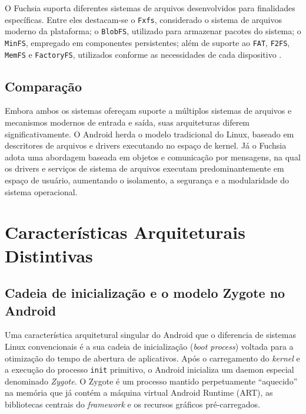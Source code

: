 \documentclass[12pt,a4paper]{article}
\begin{document}
O Fuchsia suporta diferentes sistemas de arquivos desenvolvidos para finalidades
específicas. Entre eles destacam-se o \texttt{Fxfs}, considerado o sistema de
arquivos moderno da plataforma; o \texttt{BlobFS}, utilizado para armazenar
pacotes do sistema; o \texttt{MinFS}, empregado em componentes persistentes;
além de suporte ao \texttt{FAT}, \texttt{F2FS}, \texttt{MemFS} e
\texttt{FactoryFS}, utilizados conforme as necessidades de cada dispositivo
\cite{fuchsia_fs}.

\subsection{Comparação}

Embora ambos os sistemas ofereçam suporte a múltiplos sistemas de arquivos e
mecanismos modernos de entrada e saída, suas arquiteturas diferem
significativamente. O Android herda o modelo tradicional do Linux, baseado em
descritores de arquivos e drivers executando no espaço de kernel. Já o Fuchsia
adota uma abordagem baseada em objetos e comunicação por mensagens, na qual os
drivers e serviços de sistema de arquivos executam predominantemente em espaço
de usuário, aumentando o isolamento, a segurança e a modularidade do sistema
operacional.

\section{Características Arquiteturais Distintivas}
\label{sec:caracteristicas_distintivas}

\subsection{Cadeia de inicialização e o modelo Zygote no Android}

Uma característica arquitetural singular do Android que o diferencia de sistemas
Linux convencionais é a sua cadeia de inicialização (\emph{boot process})
voltada para a otimização do tempo de abertura de aplicativos. Após o
carregamento do \emph{kernel} e a execução do processo \texttt{init} primitivo,
o Android inicializa um daemon especial denominado \emph{Zygote}. O Zygote é um
processo mantido perpetuamente ``aquecido'' na memória que já contém a máquina
virtual Android Runtime (ART), as bibliotecas centrais do \emph{framework} e os
recursos gráficos pré-carregados.
\end{document}
